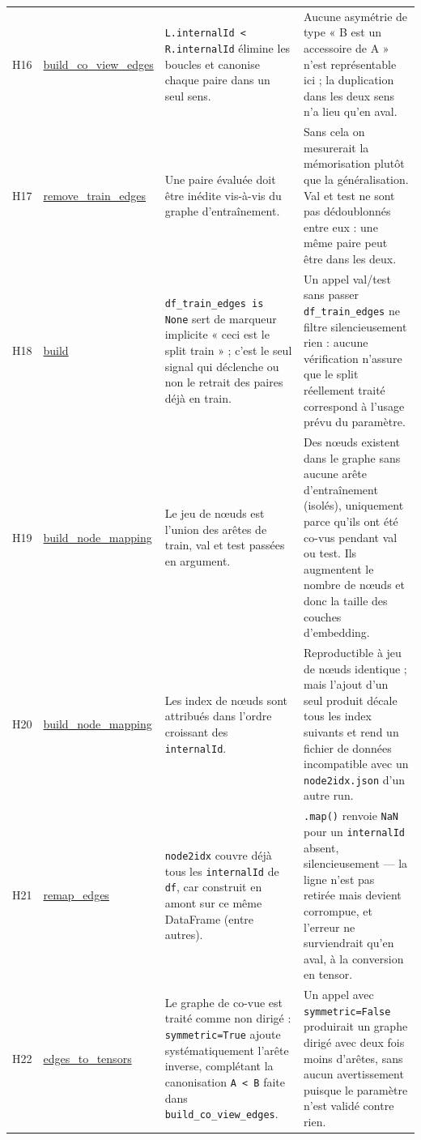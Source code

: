 \documentclass[11pt,a4paper]{article}
\newcommand{\code}[1]{\texttt{\small #1}}
\begin{document}
{\begin{longtable}{@{}l p{2.45cm} p{5.9cm} p{4.5cm}@{}}
\addlinespace
H16 & \url{build_co_view_edges} & \code{L.internalId < R.internalId} élimine les boucles et canonise chaque paire dans un seul sens. & Aucune asymétrie de type « B est un accessoire de A » n'est représentable ici ; la duplication dans les deux sens n'a lieu qu'en aval. \\
\addlinespace
H17 & \url{remove_train_edges} & Une paire évaluée doit être inédite vis-à-vis du graphe d'entraînement. & Sans cela on mesurerait la mémorisation plutôt que la généralisation. Val et test ne sont pas dédoublonnés entre eux : une même paire peut être dans les deux. \\
\addlinespace
H18 & \url{build} & \code{df\_train\_edges is None} sert de marqueur implicite « ceci est le split train » ; c'est le seul signal qui déclenche ou non le retrait des paires déjà en train. & Un appel val/test sans passer \code{df\_train\_edges} ne filtre silencieusement rien : aucune vérification n'assure que le split réellement traité correspond à l'usage prévu du paramètre. \\
\addlinespace
H19 & \url{build_node_mapping} & Le jeu de nœuds est l'union des arêtes de train, val et test passées en argument. & Des nœuds existent dans le graphe sans aucune arête d'entraînement (isolés), uniquement parce qu'ils ont été co-vus pendant val ou test. Ils augmentent le nombre de nœuds et donc la taille des couches d'embedding. \\
\addlinespace
H20 & \url{build_node_mapping} & Les index de nœuds sont attribués dans l'ordre croissant des \code{internalId}. & Reproductible à jeu de nœuds identique ; mais l'ajout d'un seul produit décale tous les index suivants et rend un fichier de données incompatible avec un \code{node2idx.json} d'un autre run. \\
\addlinespace
H21 & \url{remap_edges} & \code{node2idx} couvre déjà tous les \code{internalId} de \code{df}, car construit en amont sur ce même DataFrame (entre autres). & \code{.map()} renvoie \code{NaN} pour un \code{internalId} absent, silencieusement --- la ligne n'est pas retirée mais devient corrompue, et l'erreur ne surviendrait qu'en aval, à la conversion en tensor. \\
\addlinespace
H22 & \url{edges_to_tensors} & Le graphe de co-vue est traité comme non dirigé : \code{symmetric=True} ajoute systématiquement l'arête inverse, complétant la canonisation \code{A < B} faite dans \code{build\_co\_view\_edges}. & Un appel avec \code{symmetric=False} produirait un graphe dirigé avec deux fois moins d'arêtes, sans aucun avertissement puisque le paramètre n'est validé contre rien. \\

\end{longtable}}
\end{document}
